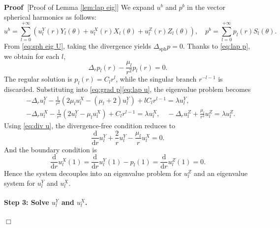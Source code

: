 \documentclass[11pt,a4paper]{article}
\numberwithin{equation}{section}
\newcommand{\mathd}{\mathrm{d}}
\newcommand{\tmop}[1]{\ensuremath{\operatorname{#1}}}
\newenvironment{proof}{\noindent\textbf{Proof\ }}{\hspace*{\fill}$\Box$\medskip}
\begin{document}
\begin{proof}[Proof of Lemma \ref{lem:lap eig}]
  We expand $u^b$ and $p^b$ in the vector spherical harmonics as follows:
  \[ u^b = \sum_{l = 0}^{+ \infty} (u_l^Y (r) Y_l (\theta) + u_l^X (r) X_l
     (\theta) + u_l^Z (r) Z_l (\theta)), \quad p^b = \sum_{l = 0}^{+ \infty}
     p_l (r) S_l (\theta) . \]
  From \eqref{eq:sph eig U}, taking the divergence yields $\Delta_{\tmop{sph}}
  p = 0$. Thanks to \eqref{eq:lap p}, we obtain for each $l$,
  \[ \Delta_r p_l (r) - \frac{\mu_l}{r^2} p_l (r) = 0. \]
  The regular solution is $p_l (r) = C_l r^l$, while the singular branch $r^{-
  l - 1}$ is discarded. Substituting into \eqref{eq:grad p}\eqref{eq:lap u},
  the eigenvalue problem becomes
  \begin{equation}
    \begin{aligned}
      & - \Delta_r u_l^Y - \frac{1}{r^2}  (2 \mu_l u_l^X - (\mu_l + 2) u_l^Y)
      + lC_l r^{l - 1} = \lambda u_l^Y,\\
      & - \Delta_r u_l^X - \frac{1}{r^2}  (2 u_l^Y - \mu_l u_l^X) + C_l r^{l
      - 1} = \lambda u_l^X, \quad - \Delta_r u_l^Z + \frac{\mu_l}{r^2} u_l^Z =
      \lambda u_l^Z . \label{eq:eig UY}
    \end{aligned}
  \end{equation}
  Using \eqref{eq:div u}, the divergence-free condition reduces to
  \begin{equation}
    \frac{\mathd}{\mathd r} u_l^Y + \frac{2}{r} u_l^Y - \frac{\mu_l}{r} u_l^X
    = 0. \label{eq:div free UX}
  \end{equation}
  And the boundary condition is
  \[ \frac{\mathd}{\mathd r} u_l^X (1) = \frac{\mathd}{\mathd r} u_l^Y (1) -
     p_l (1) = \frac{\mathd}{\mathd r} u_l^Z (1) = 0. \]
  Hence the system decouples into an eigenvalue problem for $u_l^Z$ and an
  eigenvalue system for $u_l^Y$ and $u_l^X$.
  
  \paragraph{Step 3: Solve $u_l^Y$ and $u_l^X$.}
  

\end{proof}
\end{document}
